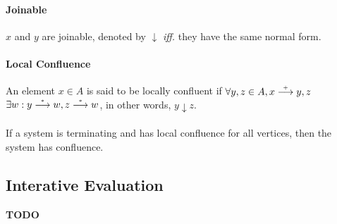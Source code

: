 \paragraph{Joinable} $x$ and $y$ are joinable, denoted by $\downarrow$ \emph{iff.} they have the same normal form.

\paragraph{Local Confluence} An element $x \in A$ is said to be locally confluent if $\forall y, z \in A, x \stackrel{\scriptscriptstyle\!+\!}\longrightarrow y, z$ $\exists w : y \stackrel{\scriptscriptstyle\!*\!}\longrightarrow w, z \stackrel{\scriptscriptstyle\!*\!}\longrightarrow w$, in other words, $y \downarrow z$.

\paragraph{\rightarrow} If a system is terminating and has local confluence for all vertices, then the system has confluence.

\subsection{Interative Evaluation}

\textbf{TODO}
